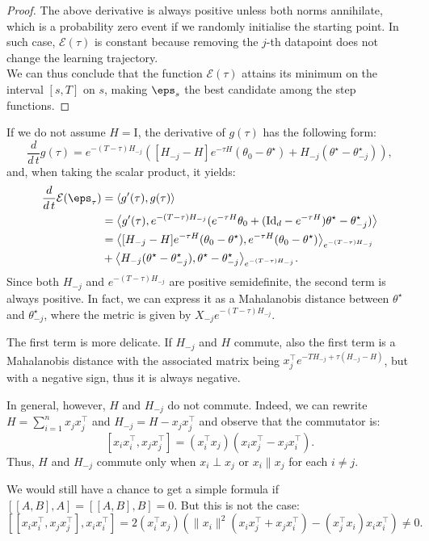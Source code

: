 \begin{proof}
The above derivative is always positive unless both norms annihilate, which is a probability zero event if we randomly initialise the starting point.
In such case, $\mathcal{E}(\tau)$ is constant because removing the $j$-th datapoint does not change the learning trajectory.\\
We can thus conclude that the function $\mathcal{E}(\tau)$ attains its minimum on the interval $[s,T]$ on $s$, making $\eps_s$ the best candidate among the step functions.
\end{proof}
\begin{remark}
  If we do not assume $H=\mathrm{I}$, the derivative of $g(\tau)$ has the following form:
  $$\frac{d}{d\,t} g(\tau) = e^{-(T-\tau) H_{-j}}\left( [H_{-j}-H]e^{-\tau H}(\theta_0-\theta^\star) + H_{-j}(\theta^\star - \theta^\star_{-j}) \right),$$
  and, when taking the scalar product, it yields:
  \begin{equation*}
    \begin{aligned}
    \frac{d}{d\,t}\mathcal{E}(\eps_\tau) & = \langle g'(\tau), g(\tau) \rangle \\
    & = \big\langle g'(\tau), e^{-(T-\tau) H_{-j}} (e^{-\tau H} \theta_0 +(\mathrm{Id}_d-e^{- \tau H})\theta^\star-\theta^\star_{-j}) \big\rangle \\
    & = \big\langle [H_{-j}-H]e^{-\tau H}(\theta_0-\theta^\star) , e^{-\tau H}(\theta_0-\theta^\star) \big\rangle_{e^{-(T-\tau) H_{-j}}} \\
    & + \big\langle H_{-j}(\theta^\star - \theta^\star_{-j}), \theta^\star - \theta^\star_{-j} \big\rangle_{e^{-(T-\tau) H_{-j}}} .
  \end{aligned}
  \end{equation*}
  Since both $H _{-j}$ and $e^{-(T-\tau) H_{-j}}$ are positive semidefinite, the second term is always positive.
  In fact, we can express it as a Mahalanobis distance between $\theta^\star$ and $\theta^\star_{-j}$, where the metric is given by $X_{-j} e^{-(T-\tau) H_{-j}}$.

  The first term is more delicate. 
  If $H_{-j}$ and $H$ commute, also the first term is a Mahalanobis distance with the associated matrix being $x_j^\top e^{-T H_{-j}+\tau(H_{-j}-H)}$, but with a negative sign, thus it is always negative.
  
  In general, however, $H$ and $H_{-j}$ do not commute. 
  Indeed, we can rewrite $H=\sum_{i=1}^n x_j x_j^\top$ and $H_{-j}=H-x_j x_j^\top$ and observe that the commutator is:
  $$[x_i x_i^\top, x_j x_j^\top]= (x_i^\top x_j) (x_i x_j^\top - x_j x_i^\top).$$
  Thus, $H$ and $H_{-j}$ commute only when $x_i \perp x_j$ or $x_i \parallel x_j$ for each $i \neq j$.
  
  We would still have a chance to get a simple formula if $[[A,B],A]=[[A,B],B]=0$.
  But this is not the case:
  $$[[x_i x_i^\top, x_j x_j^\top], x_i x_i^\top] = 2(x_i^\top x_j) (\|x_i\|^2 (x_i x_j^\top+ x_j x_i^\top) - (x_j^\top x_i)x_i x_i^\top) \neq 0.$$
\end{remark}

